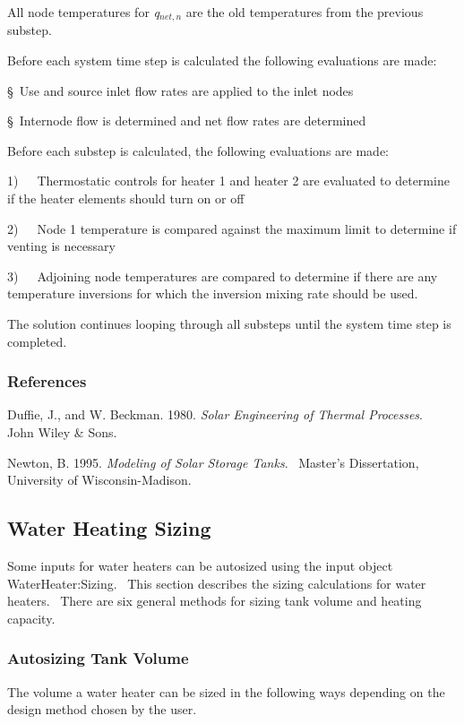 All node temperatures for \emph{q\(_{net,n}\)} are the old temperatures from the previous substep.

Before each system time step is calculated the following evaluations are made:

§~Use and source inlet flow rates are applied to the inlet nodes

§~Internode flow is determined and net flow rates are determined

Before each substep is calculated, the following evaluations are made:

1)~~~Thermostatic controls for heater 1 and heater 2 are evaluated to determine if the heater elements should turn on or off

2)~~~Node 1 temperature is compared against the maximum limit to determine if venting is necessary

3)~~~Adjoining node temperatures are compared to determine if there are any temperature inversions for which the inversion mixing rate should be used.

The solution continues looping through all substeps until the system time step is completed.

\subsubsection{References}\label{references-1-017}

Duffie, J., and W. Beckman. 1980. \emph{Solar Engineering of Thermal Processes}.~ John Wiley \& Sons.

Newton, B. 1995. \emph{Modeling of Solar Storage Tanks}.~ Master's Dissertation, University of Wisconsin-Madison.

\subsection{Water Heating Sizing}\label{water-heating-sizing}

Some inputs for water heaters can be autosized using the input object WaterHeater:Sizing.~ This section describes the sizing calculations for water heaters.~ There are six general methods for sizing tank volume and heating capacity.

\subsubsection{Autosizing Tank Volume}\label{autosizing-tank-volume}

The volume a water heater can be sized in the following ways depending on the design method chosen by the user.

